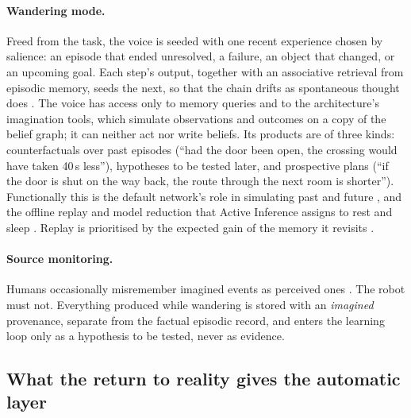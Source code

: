\paragraph{Wandering mode.}
Freed from the task, the voice is seeded with one recent experience chosen by salience: an episode that ended
unresolved, a failure, an object that changed, or an upcoming goal. Each step's output, together with an
associative retrieval from episodic memory, seeds the next, so that the chain drifts as spontaneous thought does
\cite{christoff2016mind}. The voice has access only to memory queries and to the architecture's imagination tools,
which simulate observations and outcomes on a copy of the belief graph; it can neither act nor write beliefs. Its
products are of three kinds: counterfactuals over past episodes (``had the door been open, the crossing would have
taken 40\,s less''), hypotheses to be tested later, and prospective plans (``if the door is shut on the way back,
the route through the next room is shorter''). Functionally this is the default network's role in simulating
past and future \cite{buckner2008brain}, and the offline replay and model reduction that Active Inference assigns
to rest and sleep \cite{friston2017curiosity, hobson2012waking}. Replay is prioritised by the expected gain of the
memory it revisits \cite{mattar2018prioritized}.

\paragraph{Source monitoring.}
Humans occasionally misremember imagined events as perceived ones \cite{johnson1993source}. The robot must not.
Everything produced while wandering is stored with an \emph{imagined} provenance, separate from the factual
episodic record, and enters the learning loop only as a hypothesis to be tested, never as evidence.

\subsection{What the return to reality gives the automatic layer}
\label{sec:inner_speech:return}

